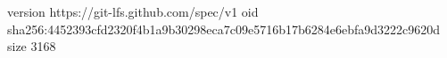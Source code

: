 version https://git-lfs.github.com/spec/v1
oid sha256:4452393cfd2320f4b1a9b30298eca7c09e5716b17b6284e6ebfa9d3222c9620d
size 3168
